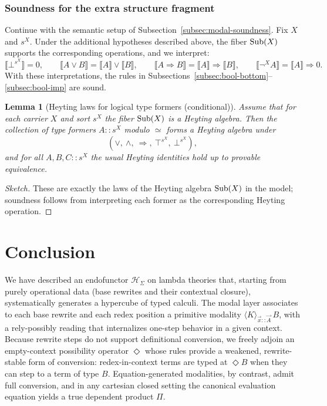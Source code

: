\documentclass[11pt]{article}
\theoremstyle{definition}
\theoremstyle{plain}
\newtheorem{lemma}[definition]{Lemma}
\theoremstyle{remark}
\theoremstyle{plain}
\newcommand{\angles}[3]{\langle #1 \rangle_{#2}\,#3}
\newcommand{\sem}[1]{\llbracket #1 \rrbracket}
\begin{document}
\subsubsection*{Soundness for the extra structure fragment}
\label{subsec:bool-soundness}

Continue with the semantic setup of Subsection~\ref{subsec:modal-soundness}. Fix $X$ and $s^{X}$.
Under the additional hypotheses described above, the fiber ${\rm Sub}(X)$ supports the corresponding
operations, and we interpret:
\[
  \sem{\bot^{s^{X}}}=0,\qquad
  \sem{A\vee B}=\sem{A}\vee\sem{B},\qquad
  \sem{A\Rightarrow B}=\sem{A}\Rightarrow\sem{B},\qquad
  \sem{\neg^{X}A}=\sem{A}\Rightarrow 0.
\]
With these interpretations, the rules in Subsections~\ref{subsec:bool-bottom}--\ref{subsec:bool-imp} are sound.

\begin{lemma}[Heyting laws for logical type formers (conditional)]
Assume that for each carrier $X$ and sort $s^{X}$ the fiber ${\rm Sub}(X)$ is a Heyting algebra.
Then the collection of type formers $A::s^{X}$ modulo $\simeq$ forms a Heyting algebra under
\[
  (\vee,\ \wedge,\ \Rightarrow,\ \top^{s^{X}},\ \bot^{s^{X}}),
\]
and for all $A,B,C::s^{X}$ the usual Heyting identities hold up to provable equivalence.
\end{lemma}

\begin{proof}[Sketch]
These are exactly the laws of the Heyting algebra ${\rm Sub}(X)$ in the model; soundness
follows from interpreting each former as the corresponding Heyting operation.
\end{proof}

\section{Conclusion}

We have described an endofunctor $\mathcal{H}_\Sigma$ on lambda theories that, starting from purely operational data (base rewrites and their contextual closure), systematically generates a hypercube of typed calculi. The modal layer associates to each base rewrite and each redex position a primitive modality $\angles{K}{\vec x::\vec A}{B}$, with a rely-possibly reading that internalizes one-step behavior in a given context. Because rewrite steps do not support definitional conversion, we freely adjoin an empty-context possibility operator $\Diamond$ whose rules provide a weakened, rewrite-stable form of conversion: redex-in-context terms are typed at $\Diamond B$ when they can step to a term of type $B$. Equation-generated modalities, by contrast, admit full conversion, and in any cartesian closed setting the canonical evaluation equation yields a true dependent product $\Pi$.
\end{document}
